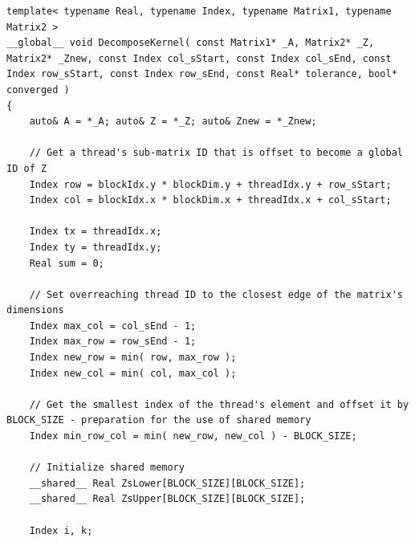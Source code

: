 \begin{lstlisting}[caption={The constant \code{BLOCK\_SIZE} is by default hard-coded to be equal to 8 in the \code{CroutMethodIterative} header file using the \code{\#define} macro. The kernel takes matrices $ \mathbb{A} $, $ \mathbb{Z} $ (iteration $ t $ of $ \mathbb{Z} $), and $ \mathbb{Z}_{new} $ (iteration $ t+1 $ of $ \mathbb{Z} $) as input parameters, and uses other input variables to offset the threads in the grid so that only a specific section of $ \mathbb{Z} $ is computed. Note that the kernel is not part of the \code{CroutMethodIteartive} class since kernels cannot be members of a class - as mentioned in \textit{\nameref{Paragraph:CUDA-C++-extensions-outer-kernel-extensions-function-extensions}} in Section~\ref{Paragraph:CUDA-C++-extensions-outer-kernel-extensions-function-extensions} - however, it is located in the same file that it is called from. Taken from the Decomposition project repository on GitLab\protect\footref{Footnote:decomposition-project-gitlab-url}.},label={Listing:implementation-decomposition-project-lu-decomposition-iterative-crout-method-convergence-of-single-section},escapechar=@]
template< typename Real, typename Index, typename Matrix1, typename Matrix2 >
__global__ void DecomposeKernel( const Matrix1* _A, Matrix2* _Z, Matrix2* _Znew, const Index col_sStart, const Index col_sEnd, const Index row_sStart, const Index row_sEnd, const Real* tolerance, bool* converged )
{
	auto& A = *_A; auto& Z = *_Z; auto& Znew = *_Znew;
	
	// Get a thread's sub-matrix ID that is offset to become a global ID of Z
	Index row = blockIdx.y * blockDim.y + threadIdx.y + row_sStart;
	Index col = blockIdx.x * blockDim.x + threadIdx.x + col_sStart;
	
	Index tx = threadIdx.x;
	Index ty = threadIdx.y;
	Real sum = 0;
	
	// Set overreaching thread ID to the closest edge of the matrix's dimensions
	Index max_col = col_sEnd - 1;
	Index max_row = row_sEnd - 1;
	Index new_row = min( row, max_row );
	Index new_col = min( col, max_col );
	
	// Get the smallest index of the thread's element and offset it by BLOCK_SIZE - preparation for the use of shared memory
	Index min_row_col = min( new_row, new_col ) - BLOCK_SIZE;
	
	// Initialize shared memory
	__shared__ Real ZsLower[BLOCK_SIZE][BLOCK_SIZE];
	__shared__ Real ZsUpper[BLOCK_SIZE][BLOCK_SIZE];
	
	Index i, k;
	

\end{lstlisting}
